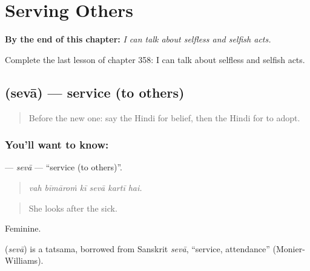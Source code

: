 
\chapter{Serving Others}
\label{ch:hi-serving-others}

\begin{chapteropening}
\textbf{By the end of this chapter:} \emph{I can talk about selfless and selfish acts.}

Complete the last lesson of chapter 358: I can talk about selfless and selfish acts.
\end{chapteropening}

\section[\texorpdfstring{\hi{सेवा} (sevā)}{सेवा (sevā)}]{ (sevā) — service (to others)}

\label{lesson:HI-C358-seva}



\begin{quote}
Before the new one: say the Hindi for belief, then the Hindi for to adopt.
\end{quote}

\subsection*{You'll want to know: }
\textbf{} — \emph{sevā} — \textquotedblleft{}service (to others)\textquotedblright{}.

\begin{quote}
     
\end{quote}

\begin{quote}
\emph{vah bīmāroṁ kī sevā kartī hai.}
\end{quote}

\begin{quote}
She looks after the sick.
\end{quote}

Feminine.

\begin{cousinweb}
\textbf{} (\emph{sevā}) is a tatsama, borrowed from Sanskrit \emph{sevā}, \textquotedblleft{}service, attendance\textquotedblright{} (Monier-Williams).
\end{cousinweb}

